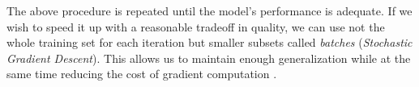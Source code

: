     The above procedure is repeated until the model's performance is adequate. If we wish to speed it up with a reasonable tradeoff in quality, we can use not the whole training set for each iteration but smaller subsets called \textit{batches} (\textit{Stochastic Gradient Descent}). This allows us to maintain enough generalization while at the same time reducing the cost of gradient computation \cite{lecun-dl}.